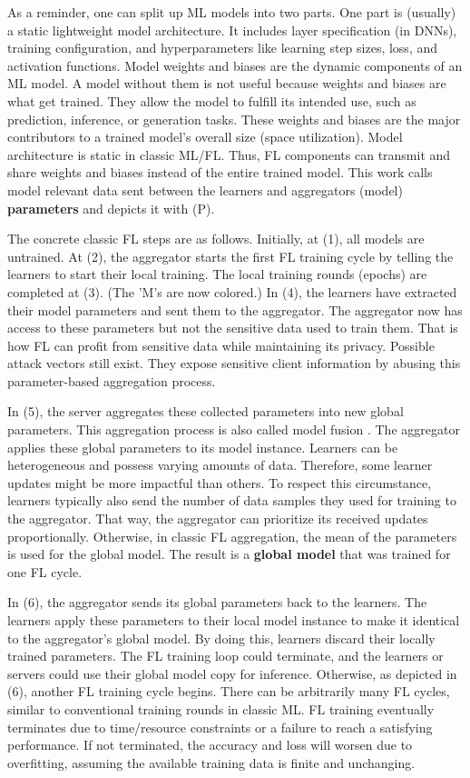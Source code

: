 As a reminder, one can split up ML models into two parts.
One part is (usually) a static lightweight model architecture.
It includes layer specification (in DNNs), training configuration, and hyperparameters like learning step sizes, loss, and activation functions.
Model weights and biases are the dynamic components of an ML model.
A model without them is not useful because weights and biases are what get trained.
They allow the model to fulfill its intended use, such as prediction, inference, or generation tasks.
These weights and biases are the major contributors to a trained model's overall size (space utilization).
Model architecture is static in classic ML/FL.
Thus, FL components can transmit and share weights and biases instead of the entire trained model.
This work calls model relevant data sent between the learners and aggregators (model) \textbf{parameters} and depicts it with (P).

The concrete classic FL steps are as follows.
Initially, at (1), all models are untrained.
At (2), the aggregator starts the first FL training cycle by telling the learners to start their local training.
The local training rounds (epochs) are completed at (3).
(The 'M's are now colored.)
In (4), the learners have extracted their model parameters and sent them to the aggregator.
The aggregator now has access to these parameters but not the sensitive data used to train them.
That is how FL can profit from sensitive data while maintaining its privacy.
Possible attack vectors still exist.
They expose sensitive client information by abusing this parameter-based aggregation process.

In (5), the server aggregates these collected parameters into new global parameters.
This aggregation process is also called model fusion \cite{book:fl}.
The aggregator applies these global parameters to its model instance.
Learners can be heterogeneous and possess varying amounts of data.
Therefore, some learner updates might be more impactful than others.
To respect this circumstance, learners typically also send the number of data samples they used for training to the aggregator.
That way, the aggregator can prioritize its received updates proportionally.
Otherwise, in classic FL aggregation, the mean of the parameters is used for the global model.
The result is a \textbf{global model} that was trained for one FL cycle.

In (6), the aggregator sends its global parameters back to the learners.
The learners apply these parameters to their local model instance to make it identical to the aggregator's global model.
By doing this, learners discard their locally trained parameters.
The FL training loop could terminate, and the learners or servers could use their global model copy for inference.
Otherwise, as depicted in (6), another FL training cycle begins.
There can be arbitrarily many FL cycles, similar to conventional training rounds in classic ML.
FL training eventually terminates due to time/resource constraints or a failure to reach a satisfying performance.
If not terminated, the accuracy and loss will worsen due to overfitting, assuming the available training data is finite and unchanging.
